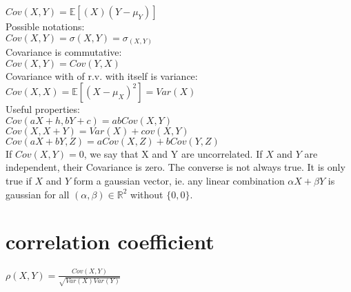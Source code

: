 $ Cov(X,Y)= \displaystyle  \mathbb E[(X)(Y-\mu _ Y)]$\\

Possible notations:\\

$Cov(X,Y) = \sigma(X,Y) = \sigma_ {(X,Y)}$\\

Covariance is commutative:\\

$Cov(X,Y) = Cov(Y,X)$\\

Covariance with of r.v. with itself is variance:\\

$Cov(X,X) = \mathbb E[(X - \mu _ X)^2] = Var(X)$\\

Useful properties:\\

$Cov(aX + h,bY + c)= abCov(X,Y)$\\

$Cov(X,X + Y)= Var(X) + cov(X,Y)$\\

$\displaystyle  Cov(aX+ bY, Z) \displaystyle = aCov(X,Z) + bCov(Y,Z)$\\

If $Cov(X,Y) = 0$, we say that X and Y are uncorrelated. If $X$ and $Y$ are independent, their Covariance is zero. The converse is not always true. It is only true if $X$ and $Y$ form a gaussian vector, ie. any linear combination $\alpha X + \beta Y$ is gaussian for all $(\alpha,\beta) \in \mathbb{R}^2$ without $\{0,0\}$.

\section{correlation coefficient}

$\rho(X,Y) = \frac{Cov(X,Y)}{\sqrt{Var(X)Var(Y)}}$